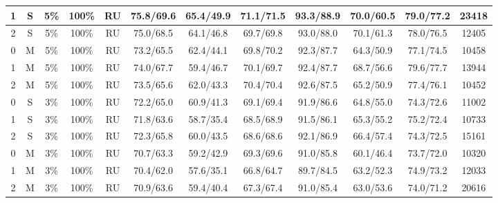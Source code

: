 \begin{table*}
{\begin{tabular}{|c|c|c|c|c||c|c|c|c|c|c||c|}
1 & S & 5\% & 100\% & RU & 75.8/69.6 & 65.4/49.9 & 71.1/71.5 & 93.3/88.9 & 70.0/60.5 & 79.0/77.2 & 23418 \\ \hline
2 & S & 5\% & 100\% & RU & 75.0/68.5 & 64.1/46.8 & 69.7/69.8 & 93.0/88.0 & 70.1/61.3 & 78.0/76.5 & 12405 \\ \hline
0 & M & 5\% & 100\% & RU & 73.2/65.5 & 62.4/44.1 & 69.8/70.2 & 92.3/87.7 & 64.3/50.9 & 77.1/74.5 & 10458 \\ \hline
1 & M & 5\% & 100\% & RU & 74.0/67.7 & 59.4/46.7 & 70.1/69.7 & 92.4/87.7 & 68.7/56.6 & 79.6/77.7 & 13944 \\ \hline
2 & M & 5\% & 100\% & RU & 73.5/65.6 & 62.0/43.3 & 70.4/70.4 & 92.6/87.5 & 65.2/50.9 & 77.4/76.1 & 10452 \\ \hline
0 & S & 3\% & 100\% & RU & 72.2/65.0 & 60.9/41.3 & 69.1/69.4 & 91.9/86.6 & 64.8/55.0 & 74.3/72.6 & 11002 \\ \hline
1 & S & 3\% & 100\% & RU & 71.8/63.6 & 58.7/35.4 & 68.5/68.9 & 91.5/86.1 & 65.3/55.2 & 75.2/72.4 & 10733 \\ \hline
2 & S & 3\% & 100\% & RU & 72.3/65.8 & 60.0/43.5 & 68.6/68.6 & 92.1/86.9 & 66.4/57.4 & 74.3/72.5 & 15161 \\ \hline
0 & M & 3\% & 100\% & RU & 70.7/63.3 & 59.2/42.9 & 69.3/69.6 & 91.0/85.8 & 60.1/46.4 & 73.7/72.0 & 10320 \\ \hline
1 & M & 3\% & 100\% & RU & 70.4/62.0 & 57.6/35.1 & 66.8/64.7 & 89.7/84.5 & 63.2/52.3 & 74.9/73.2 & 12033 \\ \hline
2 & M & 3\% & 100\% & RU & 70.9/63.6 & 59.4/40.4 & 67.3/67.4 & 91.0/85.4 & 63.0/53.6 & 74.0/71.2 & 20616 \\ \hline
\end{tabular}
}
\end{table*}

